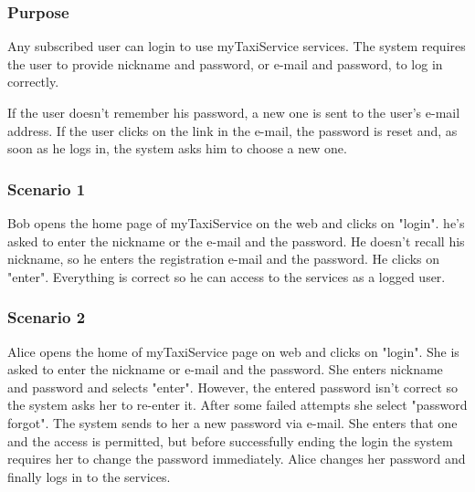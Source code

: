 \label{user-login}
\subsubsection{Purpose}
Any subscribed user can login to use myTaxiService services.
The system requires the user to provide nickname and password, or e-mail and password, to log in correctly.

If the user doesn't remember his password, a new one is sent to the user's e-mail address. If the user clicks on the link in the e-mail, the password is reset and, as soon as he logs in, the system asks him to choose a new one. 

\subsubsection{Scenario 1}
Bob opens the home page of myTaxiService on the web and clicks on "login". 
he's asked to enter the nickname or the e-mail and the password. He doesn't recall his nickname, so he enters the registration e-mail and the password. He clicks on "enter". 
Everything is correct so he can access to the services as a logged user.

\subsubsection{Scenario 2}
Alice opens the home of myTaxiService page on web and clicks on "login".  
She is asked to enter the nickname or e-mail and the password.
She enters nickname and password and selects "enter". However, the entered password isn't correct so the system asks her to re-enter it. 
After some failed attempts she select "password forgot".
The system sends to her a new password via e-mail. She enters that one and the access is permitted, but before successfully ending the login the system requires her to change the password immediately. 
Alice changes her password and finally logs in to the services.


